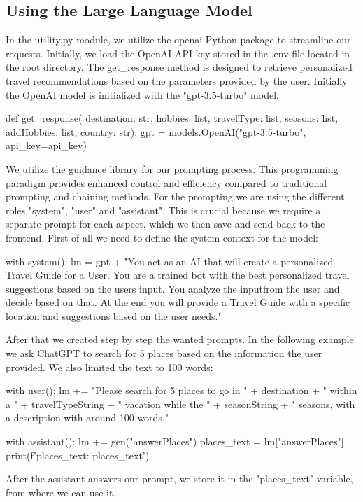 \documentclass[english,notitlepage,smartquotes]{hgbreport}
\begin{document}
\subsection{Using the Large Language Model}
In the utility.py module, we utilize the openai Python package to streamline our requests. Initially, we load the OpenAI API key stored in the .env file located in the root directory. The get\_response method is designed to retrieve personalized travel recommendations based on the parameters provided by the user. Initially the OpenAI model is initialized with the "gpt-3.5-turbo" model.
\begin{PythonCode}
	def get_response(
	destination: str, hobbies: list, travelType: list, seasons: list, addHobbies: list, country: str):
	gpt = models.OpenAI("gpt-3.5-turbo", api_key=api_key)
\end{PythonCode}
We utilize the guidance library for our prompting process. This programming paradigm provides enhanced control and efficiency compared to traditional prompting and chaining methods. For the prompting we are using the different roles "system", "user" and "assistant". This is crucial because we require a separate prompt for each aspect, which we then save and send back to the frontend. First of all we need to define the system context for the model: 
\begin{PythonCode}
	with system():
	lm = gpt + "You act as an AI that will create a personalized Travel Guide for a User. You are a trained bot with the best personalized travel suggestions based on the users input. You analyze the inputfrom the user and decide based on that. At the end you will provide a Travel Guide with a specific location and suggestions based on the user needs."
\end{PythonCode}
After that we created step by step the wanted prompts. In the following example we ask ChatGPT to search for 5 places based on the information the user provided. We also limited the text to 100 words:
\begin{PythonCode}
	with user():
	lm += "Please search for 5 places to go in " + destination + " within a " + travelTypeString + " vacation while the " + seasonString + " seasons, with a description with around 100 words."
	
	with assistant():
	lm += gen("answerPlaces")
	places_text = lm["answerPlaces"]
	print(f'places_text: {places_text}')
\end{PythonCode}
After the assistant answers our prompt, we store it in the "places\_text" variable, from where we can use it.
\end{document}
